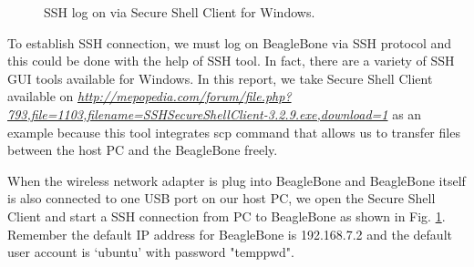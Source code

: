 \documentclass[12pt,journal,draftclsnofoot,onecolumn]{IEEEtran}
\begin{document}
\begin{figure}[htb]
	\centering

     \caption{SSH log on via Secure Shell Client for Windows.}\label{ssh}
     \end{figure}
     
To establish SSH connection, we must log on BeagleBone via SSH protocol and this could be done with the help of SSH tool. In fact, there are a variety of SSH GUI tools available for Windows. In this report, we take Secure Shell Client available on \textcolor{blue}{\textit{\url{http://mepopedia.com/forum/file.php?793,file=1103,filename=SSHSecureShellClient-3.2.9.exe,download=1}}}  as an example because this tool integrates scp command that allows us to transfer files between the host PC and the BeagleBone freely.

When the wireless network adapter is plug into BeagleBone and BeagleBone itself is also connected to one USB port on our host PC, we open the Secure Shell Client and start a SSH connection from PC to BeagleBone as shown in Fig. \ref{ssh}. Remember the default IP address for BeagleBone is 192.168.7.2 and the default user account is `ubuntu' with password "temppwd".
\end{document}
